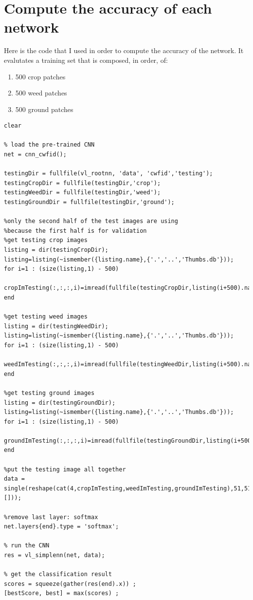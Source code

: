 \documentclass[]{report}
\begin{document}
\section{Compute the accuracy of each network}

Here is the code that I used in order to compute the accuracy of the network. It evalutates a training set that is composed, in order, of:
\begin{enumerate}
\item 500 crop patches
\item 500 weed patches
\item 500 ground patches
\end{enumerate}

\begin{lstlisting}
clear

% load the pre-trained CNN
net = cnn_cwfid();

testingDir = fullfile(vl_rootnn, 'data', 'cwfid','testing');
testingCropDir = fullfile(testingDir,'crop');
testingWeedDir = fullfile(testingDir,'weed');
testingGroundDir = fullfile(testingDir,'ground');

%only the second half of the test images are using 
%because the first half is for validation
%get testing crop images 
listing = dir(testingCropDir);
listing=listing(~ismember({listing.name},{'.','..','Thumbs.db'}));
for i=1 : (size(listing,1) - 500)
    cropImTesting(:,:,:,i)=imread(fullfile(testingCropDir,listing(i+500).name));
end

%get testing weed images 
listing = dir(testingWeedDir);
listing=listing(~ismember({listing.name},{'.','..','Thumbs.db'}));
for i=1 : (size(listing,1) - 500)
    weedImTesting(:,:,:,i)=imread(fullfile(testingWeedDir,listing(i+500).name));
end

%get testing ground images 
listing = dir(testingGroundDir);
listing=listing(~ismember({listing.name},{'.','..','Thumbs.db'}));
for i=1 : (size(listing,1) - 500)
    groundImTesting(:,:,:,i)=imread(fullfile(testingGroundDir,listing(i+500).name));
end

%put the testing image all together
data = single(reshape(cat(4,cropImTesting,weedImTesting,groundImTesting),51,51,3,[]));

%remove last layer: softmax  
net.layers{end}.type = 'softmax';

% run the CNN
res = vl_simplenn(net, data);

% get the classification result
scores = squeeze(gather(res(end).x)) ;
[bestScore, best] = max(scores) ;


\end{lstlisting}
\end{document}
